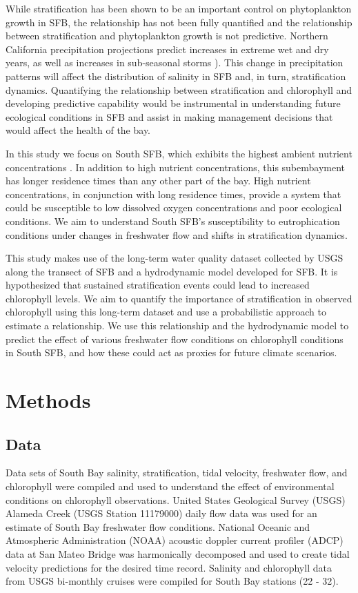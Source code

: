 \documentclass[preprint,review,12pt]{elsarticle}
\begin{document}
While stratification has been shown to be an important control on phytoplankton growth in SFB, the relationship has not been fully quantified and the relationship between stratification and phytoplankton growth is not predictive. Northern California precipitation projections predict increases in extreme wet and dry years, as well as increases in sub-seasonal storms \citep{swain2018}). This change in precipitation patterns will affect the distribution of salinity in SFB and, in turn, stratification dynamics. Quantifying the relationship between stratification and chlorophyll and developing predictive capability would be instrumental in understanding future ecological conditions in SFB and assist in making management decisions that would affect the health of the bay. 

In this study we focus on South SFB, which exhibits the highest ambient nutrient concentrations \citep{novick2014}. In addition to high nutrient concentrations, this subembayment has longer residence times than any other part of the bay. High nutrient concentrations, in conjunction with long residence times, provide a system that could be susceptible to low dissolved oxygen concentrations and poor ecological conditions. We aim to understand South SFB's susceptibility to eutrophication conditions under changes in freshwater flow and shifts in stratification dynamics.

This study makes use of the long-term water quality dataset collected by USGS along the transect of SFB and a hydrodynamic model developed for SFB. It is hypothesized that sustained stratification events could lead to increased chlorophyll levels. We aim to quantify the importance of stratification in observed chlorophyll using this long-term dataset and use a probabilistic approach to estimate a relationship. We use this relationship and the hydrodynamic model to predict the effect of various freshwater flow conditions on chlorophyll conditions in South SFB, and how these could act as proxies for future climate scenarios.  

\section{Methods}\label{S:methods}
\subsection{Data}\label{S:data}
Data sets of South Bay salinity, stratification, tidal velocity, freshwater flow, and chlorophyll were compiled and used to understand the effect of environmental conditions on chlorophyll observations. United States Geological Survey (USGS) Alameda Creek (USGS Station 11179000) daily flow data was used for an estimate of South Bay freshwater flow conditions. National Oceanic and Atmospheric Administration (NOAA) acoustic doppler current profiler (ADCP) data at San Mateo Bridge was harmonically decomposed and used to create tidal velocity predictions for the desired time record. Salinity and chlorophyll data from USGS bi-monthly cruises were compiled for South Bay stations (22 - 32).  
\end{document}
